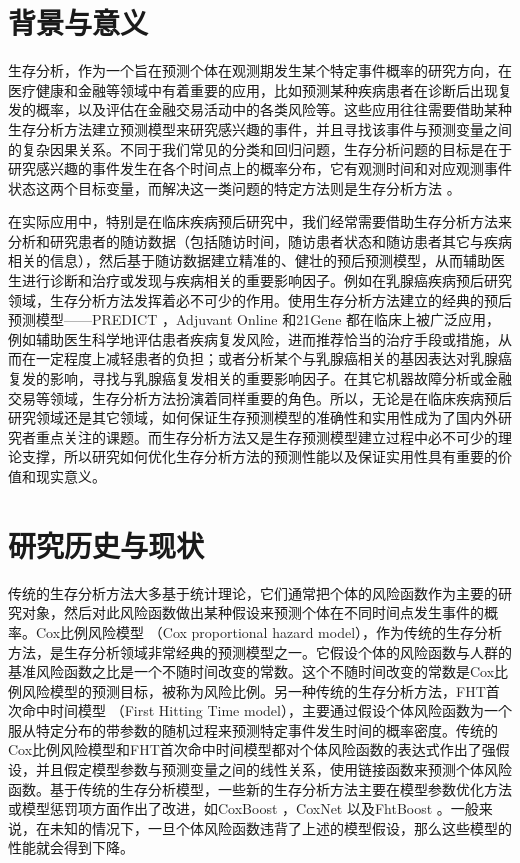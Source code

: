 \thesischapterexordium

\section{背景与意义}

生存分析，作为一个旨在预测个体在观测期发生某个特定事件概率的研究方向，在医疗健康和金融等领域中有着重要的应用，比如预测某种疾病患者在诊断后出现复发的概率，以及评估在金融交易活动中的各类风险等。这些应用往往需要借助某种生存分析方法建立预测模型来研究感兴趣的事件，并且寻找该事件与预测变量之间的复杂因果关系。不同于我们常见的分类和回归问题，生存分析问题的目标是在于研究感兴趣的事件发生在各个时间点上的概率分布，它有观测时间和对应观测事件状态这两个目标变量，而解决这一类问题的特定方法则是生存分析方法 。

在实际应用中，特别是在临床疾病预后研究中，我们经常需要借助生存分析方法来分析和研究患者的随访数据（包括随访时间，随访患者状态和随访患者其它与疾病相关的信息），然后基于随访数据建立精准的、健壮的预后预测模型，从而辅助医生进行诊断和治疗或发现与疾病相关的重要影响因子。例如在乳腺癌疾病预后研究领域，生存分析方法发挥着必不可少的作用。使用生存分析方法建立的经典的预后预测模型——PREDICT ，Adjuvant Online  和21Gene 都在临床上被广泛应用，例如辅助医生科学地评估患者疾病复发风险，进而推荐恰当的治疗手段或措施，从而在一定程度上减轻患者的负担；或者分析某个与乳腺癌相关的基因表达对乳腺癌复发的影响，寻找与乳腺癌复发相关的重要影响因子。在其它机器故障分析或金融交易等领域，生存分析方法扮演着同样重要的角色。所以，无论是在临床疾病预后研究领域还是其它领域，如何保证生存预测模型的准确性和实用性成为了国内外研究者重点关注的课题。而生存分析方法又是生存预测模型建立过程中必不可少的理论支撑，所以研究如何优化生存分析方法的预测性能以及保证实用性具有重要的价值和现实意义。

\section{研究历史与现状}

传统的生存分析方法大多基于统计理论，它们通常把个体的风险函数作为主要的研究对象，然后对此风险函数做出某种假设来预测个体在不同时间点发生事件的概率。Cox比例风险模型 （Cox proportional hazard model），作为传统的生存分析方法，是生存分析领域非常经典的预测模型之一。它假设个体的风险函数与人群的基准风险函数之比是一个不随时间改变的常数。这个不随时间改变的常数是Cox比例风险模型的预测目标，被称为风险比例。另一种传统的生存分析方法，FHT首次命中时间模型 （First Hitting Time model），主要通过假设个体风险函数为一个服从特定分布的带参数的随机过程来预测特定事件发生时间的概率密度。传统的Cox比例风险模型和FHT首次命中时间模型都对个体风险函数的表达式作出了强假设，并且假定模型参数与预测变量之间的线性关系，使用链接函数来预测个体风险函数。基于传统的生存分析模型，一些新的生存分析方法主要在模型参数优化方法或模型惩罚项方面作出了改进，如CoxBoost ，CoxNet 以及FhtBoost 。一般来说，在未知的情况下，一旦个体风险函数违背了上述的模型假设，那么这些模型的性能就会得到下降。

